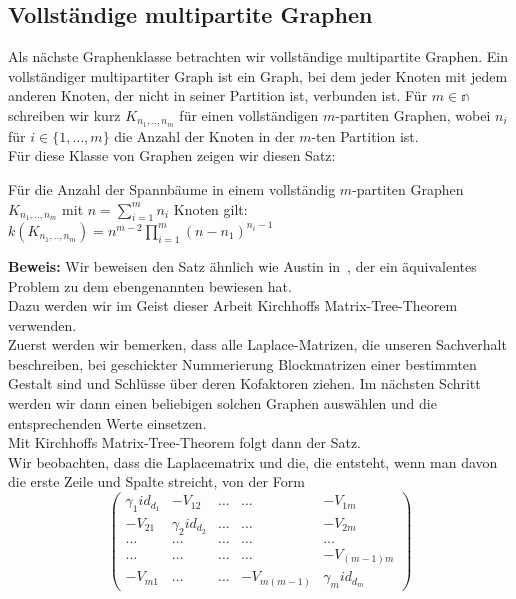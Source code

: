 \subsection{Vollständige multipartite Graphen}
Als nächste Graphenklasse betrachten wir vollständige multipartite Graphen.
Ein vollständiger multipartiter Graph ist ein Graph, bei dem jeder Knoten mit jedem anderen Knoten, der nicht in seiner Partition ist, verbunden ist. Für $m\in \mathbb{n}$ schreiben wir kurz $K_{n_1,..,n_m}$ für einen vollständigen $m$-partiten Graphen, wobei $n_i$ für $i \in \{1,\ldots,m\}$ die Anzahl der Knoten in der $m$-ten Partition ist.\\
Für diese Klasse von Graphen zeigen wir diesen Satz:
\begin{Tms}
 Für die Anzahl der Spannbäume in einem vollständig $m$-partiten Graphen $K_{n_1,..,n_m}$ mit $n=\sum_{i=1}^mn_i$ Knoten gilt:\\
 $\mathit{k}(K_{n_1,..,n_m})=n^{m-2}\prod_{i=1}^{m}(n-n_1)^{n_i-1}$
\end{Tms}
\textbf{Beweis:}
Wir beweisen den Satz ähnlich wie Austin in~\cite{austin_1960}, der ein äquivalentes Problem zu dem ebengenannten bewiesen hat.\\
Dazu werden wir im Geist dieser Arbeit Kirchhoffs Matrix-Tree-Theorem verwenden.\\
Zuerst werden wir bemerken, dass alle Laplace-Matrizen, die unseren Sachverhalt beschreiben, bei geschickter Nummerierung Blockmatrizen einer bestimmten Gestalt sind und Schlüsse über deren Kofaktoren ziehen. Im nächsten Schritt werden wir dann einen beliebigen solchen Graphen auswählen und die entsprechenden Werte einsetzen.\\
Mit Kirchhoffs Matrix-Tree-Theorem folgt dann der Satz.\\
Wir beobachten, dass die Laplacematrix und die, die entsteht, wenn man davon die erste Zeile und Spalte streicht, von der Form
\begin{equation}
\begin{pmatrix}
 {\gamma_1}id_{d_1}&-V_{12}&\ldots&\ldots&-V_{1m}\\
 -V_{21}&{\gamma_2}id_{d_2}&\ldots&\ldots&-V_{2m}\\
 \ldots&\ldots&\ldots&\ldots&\ldots\\
  \ldots&\ldots&\ldots&\ldots&-V_{(m-1)m}\\
 -V_{m1}&\ldots&\ldots&-V_{m(m-1)}&{\gamma_m}id_{d_m}
\end{pmatrix}
\end{equation}
